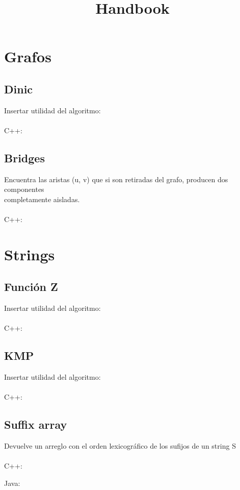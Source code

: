 \documentclass{article}
\title{Handbook}
\begin{document}
\maketitle
\tableofcontents
\pagebreak
\section{Grafos}
    \subsection{Dinic}
        Insertar utilidad del algoritmo:
        \\ \\
        C++:
        

    \subsection{Bridges}
        Encuentra las aristas (u, v) que si son retiradas del grafo, producen dos componentes \\
        completamente aisladas.
        \\ \\
        C++:
        

\pagebreak
\section{Strings}
    \subsection{Función Z}
        Insertar utilidad del algoritmo:
        \\ \\
        C++:
        
    \subsection{KMP}
        Insertar utilidad del algoritmo:
        \\ \\
        C++:
        
    \subsection{Suffix array}
        Devuelve un arreglo con el orden lexicográfico de los sufijos de un string S
        \\ \\
        C++:
        
        Java:
        
\end{document}
